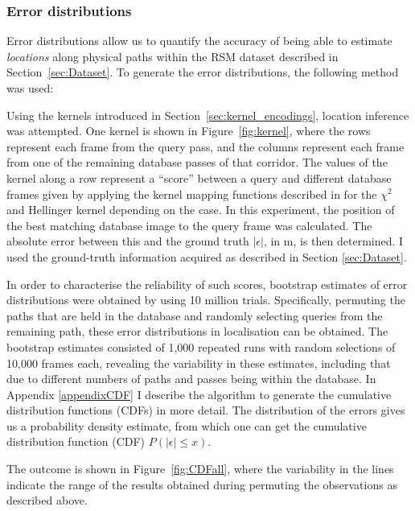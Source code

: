 \subsubsection{Error distributions}
\label{sec:CDFs}
Error distributions allow us to quantify the accuracy of being able to estimate {\em locations} along physical paths within the RSM dataset described in Section~\ref{sec:Dataset}. To generate the error distributions, the following method was used: 

Using the kernels introduced in Section~\ref{sec:kernel_encodings}, location inference was attempted. One kernel is shown in Figure~\ref{fig:kernel}, where the rows represent each frame from the query pass, and the columns represent each frame from one of the remaining database passes of that corridor. The values of the kernel along a row represent a ``score'' between a query and different database frames given by applying the kernel mapping functions described in \citep{Vedaldi2012} for the $\chi^2$ and Hellinger kernel depending on the case. In this experiment, the position of the best matching database image to the query frame was calculated. The absolute error between this and the ground truth $|\epsilon|$, in m, is then determined. I used the ground-truth information acquired as described in Section \ref{sec:Dataset}. 

In order to characterise the reliability of such scores, bootstrap estimates of error distributions were obtained by using 10 million trials. Specifically, permuting the paths that are held in the database and randomly selecting queries from the remaining path, these error distributions in localisation can be obtained. The bootstrap estimates consisted of 1,000 repeated runs with random selections of 10,000 frames each, revealing the variability in these estimates, including that due to different numbers of paths and passes being within the database. In Appendix \ref{appendixCDF} I describe the algorithm to generate the cumulative distribution functions (CDFs) in more detail. The distribution of the errors gives us a probability density estimate, from which one can get the cumulative distribution function (CDF) $P(|\epsilon| \leq x)$. 

The outcome is shown in Figure~\ref{fig:CDFall}, where the variability in the lines indicate the range of the results obtained during permuting the observations as described above.

